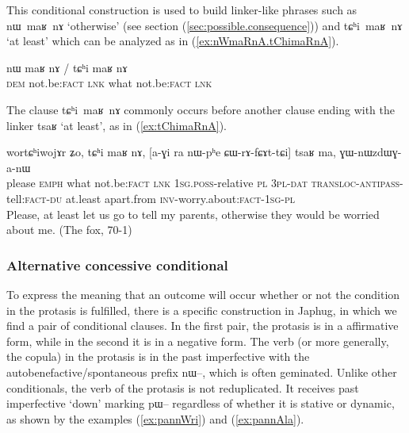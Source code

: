 \documentclass[oldfontcommands,oneside,a4paper,11pt]{article}
\newcommand{\ipa}[1]{{\phon \mbox{#1}}} %
\newcommand{\refb}[1]{(\ref{#1})}
\begin{document}
This conditional construction is used to build linker-like phrases such as \ipa{nɯ maʁ nɤ} `otherwise' (see section \refb{sec:possible.consequence}) and \ipa{tɕʰi maʁ nɤ} `at least' which can be analyzed as in \refb{ex:nWmaRnA.tChimaRnA}.
\begin{exe}
\ex  \label{ex:nWmaRnA.tChimaRnA}
\gll
 \ipa{nɯ} \ipa{maʁ} \ipa{nɤ} {              /            } \ipa{tɕʰi}  \ipa{maʁ} \ipa{nɤ} \\
 \textsc{dem} not.be:\textsc{fact} \textsc{lnk} { } what  not.be:\textsc{fact} \textsc{lnk}  \\
\end{exe}

The clause \ipa{tɕʰi maʁ nɤ} commonly occurs before another clause ending with the linker \ipa{tsaʁ} `at least', as in \refb{ex:tChimaRnA}.

\begin{exe}
\ex  \label{ex:tChimaRnA}
\gll
\ipa{wortɕʰiwojɤr} 	\ipa{ʑo,} 	\ipa{tɕʰi} 	\ipa{maʁ} 	\ipa{nɤ,} 	[\ipa{a-ɣi} 	\ipa{ra} 	\ipa{nɯ-pʰe} 	\ipa{ɕɯ-rɤ-fɕɤt-tɕi}] 	\ipa{tsaʁ} 	\ipa{ma,} 	\ipa{ɣɯ-nɯzdɯɣ-a-nɯ} 	 \\
please \textsc{emph} what not.be:\textsc{fact} \textsc{lnk} \textsc{1sg.poss}-relative \textsc{pl} \textsc{3pl-dat} \textsc{transloc-antipass}-tell:\textsc{fact}-\textsc{du} at.least  apart.from \textsc{inv}-worry.about:\textsc{fact}-\textsc{1sg-pl} \\
\glt Please, at least let us go to tell my parents, otherwise they would be worried about me. (The fox, 70-1)
\end{exe}

 
\subsubsection{Alternative concessive conditional}
To express the meaning that an outcome will occur whether or not the condition in the protasis is fulfilled, there is a specific construction in Japhug, in which we find a pair of conditional clauses. In the first pair, the protasis is in a affirmative form, while in the second it is in a negative form. The verb (or more generally, the copula) in the protasis  is in the past imperfective with the autobenefactive/spontaneous prefix \ipa{nɯ--}, which is often geminated. Unlike other conditionals, the verb of the protasis is not reduplicated. It receives past imperfective `down' marking \ipa{pɯ}-- regardless of whether it is stative or dynamic, as shown by the examples \refb{ex:pannWri} and \refb{ex:pannAla}.
\end{document}
